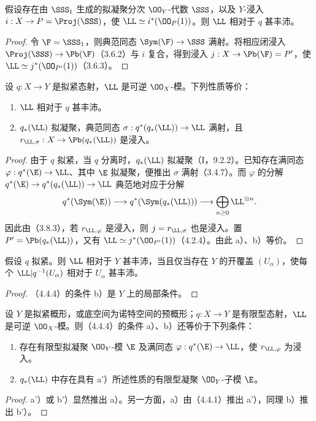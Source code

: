 假设存在由 $\SSS_1$ 生成的拟凝聚分次 $\OO_Y$-代数 $\SSS$，以及 $Y$-浸入 $i:X\to P=\Proj(\SSS)$，使 $\LL\simeq i^*(\OO_P(1))$。则 $\LL$ 相对于 $q$ 甚丰沛。
\begin{proof}
令 $\F=\SSS_1$，则典范同态 $\Sym(\F)\to\SSS$ 满射。将相应闭浸入 $\Proj(\SSS)\to\Pb(\F)$（3.6.2）与 $i$ 复合，得到浸入 $j:X\to\Pb(\F)=P'$，使 $\LL\simeq j^*(\OO_{P'}(1))$（3.6.3）。
\end{proof}

设 $q:X\to Y$ 是拟紧态射，$\LL$ 是可逆 $\OO_X$-模。下列性质等价：
\begin{enumerate}[label=\alph*)]
\item $\LL$ 相对于 $q$ 甚丰沛。
\item $q_*(\LL)$ 拟凝聚，典范同态 $\sigma:q^*(q_*(\LL))\to\LL$ 满射，且 $r_{\LL,\sigma}:X\to\Pb(q_*(\LL))$ 是浸入。
\end{enumerate}
\begin{proof}
由于 $q$ 拟紧，当 $q$ 分离时，$q_*(\LL)$ 拟凝聚（I，9.2.2）。已知存在满同态 $\varphi:q^*(\E)\to\LL$、其中 $\E$ 拟凝聚，便推出 $\sigma$ 满射（3.4.7）。而 $\varphi$ 的分解
$q^*(\E)\to q^*(q_*(\LL))\to\LL$ 典范地对应于分解
\[
q^*(\Sym(\E))\longrightarrow q^*(\Sym(q_*(\LL)))
\longrightarrow\bigoplus_{n\geq0}\LL^{\otimes n}.
\]
因此由（3.8.3），若 $r_{\LL,\varphi}$ 是浸入，则 $j=r_{\LL,\sigma}$ 也是浸入。置 $P'=\Pb(q_*(\LL))$，又有 $\LL\simeq j^*(\OO_{P'}(1))$（4.2.4）。由此 a）、b）等价。
\end{proof}

假设 $q$ 拟紧。则 $\LL$ 相对于 $Y$ 甚丰沛，当且仅当存在 $Y$ 的开覆盖 $(U_\alpha)$，使每个 $\LL|q^{-1}(U_\alpha)$ 相对于 $U_\alpha$ 甚丰沛。
\begin{proof}
（4.4.4）的条件 b）是 $Y$ 上的局部条件。
\end{proof}

设 $Y$ 是拟紧概形，或底空间为诺特空间的预概形；$q:X\to Y$ 是有限型态射，$\LL$ 是可逆 $\OO_X$-模。则（4.4.4）的条件 a）、b）还等价于下列条件：
\begin{enumerate}[label=\alph*'),start=1]
\item 存在有限型拟凝聚 $\OO_Y$-模 $\E$ 及满同态 $\varphi:q^*(\E)\to\LL$，使 $r_{\LL,\varphi}$ 为浸入。
\item $q_*(\LL)$ 中存在具有 a'）所述性质的有限型凝聚 $\OO_Y$-子模 $\E$。
\end{enumerate}
\begin{proof}
a'）或 b'）显然推出 a）。另一方面，a）由（4.4.1）推出 a'），同理 b）推出 b'）。
\end{proof}

